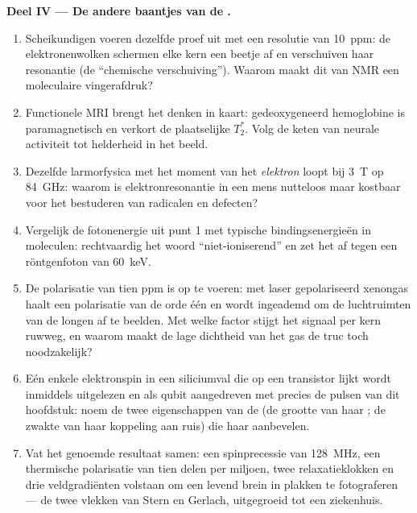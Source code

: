 \begin{problem}
\medskip\noindent\textbf{Deel IV --- De andere baantjes van de .}
\begin{enumerate}[resume]
  \item Scheikundigen voeren dezelfde proef uit met een resolutie van
        \qty{10}{ppm}: de elektronenwolken schermen elke kern een beetje
        af en verschuiven haar resonantie (de ``chemische verschuiving'').
        Waarom maakt dit van NMR een moleculaire vingerafdruk?
  \item Functionele MRI brengt het denken in kaart: gedeoxygeneerd
        hemoglobine is paramagnetisch en verkort de plaatselijke
        $T_2^*$. Volg de keten van neurale activiteit tot helderheid in
        het beeld.
  \item Dezelfde larmorfysica met het moment van het \emph{elektron}
        loopt bij \qty{3}{T} op \qty{84}{GHz}: waarom is
        elektronresonantie in een mens nutteloos maar kostbaar voor het
        bestuderen van radicalen en defecten?
  \item Vergelijk de fotonenergie uit punt 1 met typische
        bindingsenergieën in moleculen: rechtvaardig het woord
        ``niet-ioniserend'' en zet het af tegen een röntgenfoton van
        \qty{60}{keV}.
  \item De polarisatie van tien ppm is op te voeren: met laser
        gepolariseerd xenongas haalt een polarisatie van de orde één en
        wordt ingeademd om de luchtruimten van de longen af te beelden.
        Met welke factor stijgt het signaal per kern ruwweg, en waarom
        maakt de lage dichtheid van het gas de truc toch noodzakelijk?
  \item Eén enkele elektronspin in een siliciumval die op een transistor
        lijkt wordt inmiddels uitgelezen en als qubit aangedreven met
        precies de pulsen van dit hoofdstuk: noem de twee eigenschappen
        van de  (de grootte van haar ; de zwakte van
        haar koppeling aan ruis) die haar aanbevelen.
  \item Vat het genoemde resultaat samen: een spinprecessie van
        \qty{128}{MHz}, een thermische polarisatie van tien delen per
        miljoen, twee relaxatieklokken en drie veldgradiënten volstaan om
        een levend brein in plakken te fotograferen --- de twee vlekken
        van Stern en Gerlach, uitgegroeid tot een ziekenhuis.
\end{enumerate}
\end{problem}
